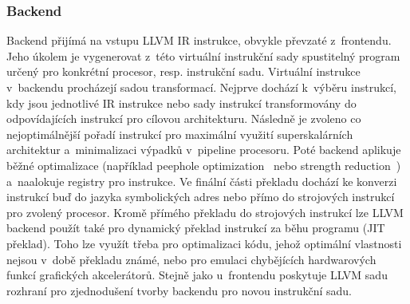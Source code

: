 \subsubsection*{Backend}
Backend přijímá na vstupu LLVM IR instrukce, obvykle převzaté z~frontendu. Jeho úkolem je vygenerovat z~této virtuální instrukční sady spustitelný program určený pro konkrétní procesor, resp. instrukční sadu. Virtuální instrukce v~backendu procházejí sadou transformací. Nejprve dochází k~výběru instrukcí, kdy jsou jednotlivé IR instrukce nebo sady instrukcí transformovány do odpovídajících instrukcí pro cílovou architekturu. Následně je zvoleno co nejoptimálnější pořadí instrukcí pro maximální využití superskalárních architektur a~minimalizaci výpadků v~pipeline procesoru. Poté backend aplikuje běžné optimalizace (například peephole optimization~\cite{peephole} nebo strength reduction~\cite{strengthreduction}) a~naalokuje registry pro instrukce. Ve finální části překladu dochází ke konverzi instrukcí buď do jazyka symbolických adres nebo přímo do strojových instrukcí pro zvolený procesor. Kromě přímého překladu do strojových instrukcí lze LLVM backend použít také pro dynamický překlad instrukcí za běhu programu (JIT překlad). Toho lze využít třeba pro optimalizaci kódu, jehož optimální vlastnosti nejsou v~době překladu známé, nebo pro emulaci chybějících hardwarových funkcí grafických akcelerátorů. Stejně jako u~frontendu poskytuje LLVM sadu rozhraní pro zjednodušení tvorby backendu pro novou instrukční sadu.
